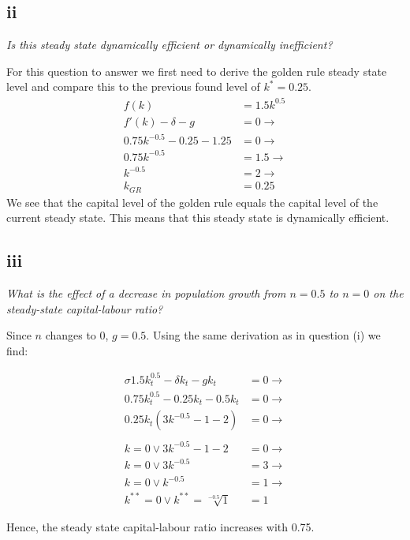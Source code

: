\documentclass[11pt,a4paper]{article}
\begin{document}
        \subsection{ii} 
\textit{Is this steady state dynamically efficient or dynamically inefficient?}

For this question to answer we first need to derive the golden rule steady state level and compare this to the previous found level of $k^*=0.25$.
\begin{align*}
f(k) &=1.5k^{0.5}\\
f'(k) -\delta - g &=0 \rightarrow \\
0.75k^{-0.5} -0.25 - 1.25 &=0 \rightarrow \\
0.75k^{-0.5} &=1.5 \rightarrow \\
k^{-0.5} &=2 \rightarrow \\
k_{GR} &= 0.25
\end{align*}
We see that the capital level of the golden rule equals the capital level of the current steady state. This means that this steady state is dynamically efficient.
        \subsection{iii} 
\textit{What is the effect of a decrease in population growth from $n = 0.5$ to $n = 0$ on the steady-state capital-labour ratio?}

Since $n$ changes to 0, $g=0.5$. Using the same derivation as in question (i) we find:

\begin{align*}
\sigma 1.5k_t^{0.5} -\delta k_t - g k_t &= 0 \rightarrow \\
0.75k_t^{0.5} - 0.25 k_t - 0.5 k_t &=0 \rightarrow \\
0.25k_t(3k^{-0.5}-1-2)&=0 \rightarrow \\ \\
k=0 \vee 3k^{-0.5}-1-2&=0 \rightarrow \\
k=0 \vee 3k^{-0.5}&=3 \rightarrow \\
k=0 \vee k^{-0.5}&=1 \rightarrow \\
k^{**}=0 \vee k^{**}=\sqrt[-0.5]1&=1
\end{align*}

Hence, the steady state capital-labour ratio increases with 0.75.
\end{document}
